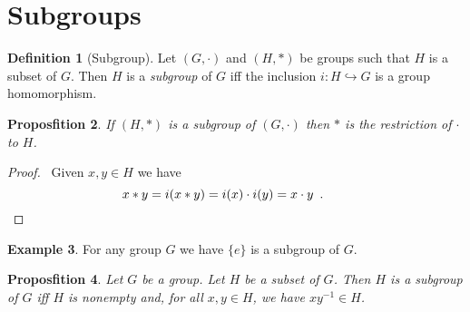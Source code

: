 \documentclass{book}
\let\qed\relax
\newtheorem{prop}{Proposfition}[chapter]
\theoremstyle{definition}
\newtheorem{df}[prop]{Definition}
\newtheorem{ex}[prop]{Example}
\newcommand{\inv}[1]{\ensuremath{{#1}^{-1}}}
\begin{document}
\section{Subgroups}

\begin{df}[Subgroup]
Let $(G,\cdot)$ and $(H,*)$ be groups such that $H$ is a subset of $G$. Then $H$ is a \emph{subgroup} of $G$ iff the inclusion $i : H \hookrightarrow G$ is a group homomorphism.
\end{df}

\begin{prop}
If $(H,*)$ is a subgroup of $(G,\cdot)$ then $*$ is the restriction of $\cdot$ to $H$.
\end{prop}

\begin{proof}
\pf\ Given $x,y \in H$ we have
\[ x * y = i(x * y) = i(x) \cdot i(y) = x \cdot y \enspace .  \qquad \qed \]
\end{proof}

\begin{ex}
For any group $G$ we have $\{e\}$ is a subgroup of $G$.
\end{ex}

\begin{prop}
Let $G$ be a group. Let $H$ be a subset of $G$. Then $H$ is a subgroup of $G$ iff $H$ is nonempty and, for all $x,y \in H$, we have $x \inv{y} \in H$.
\end{prop}
\end{document}
